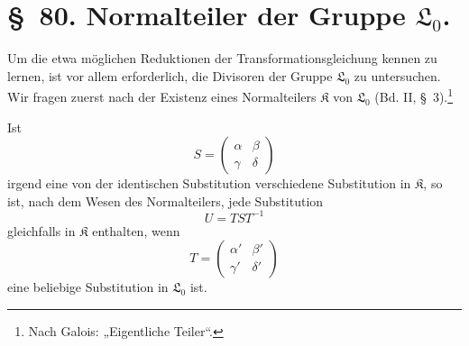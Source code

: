 \documentclass[11pt]{article}
\newcommand{\Lzero}{\mathfrak L_0}
\newcommand{\Kgrp}{\mathfrak K}
\begin{document}
\section*{\S~80. Normalteiler der Gruppe $\Lzero$.}

Um die etwa möglichen Reduktionen der Transformationsgleichung kennen zu lernen, ist vor allem erforderlich, die Divisoren der Gruppe $\Lzero$ zu untersuchen. Wir fragen zuerst nach der Existenz eines Normalteilers $\Kgrp$ von $\Lzero$ (Bd. II, \S~3).\footnote{Nach Galois: „Eigentliche Teiler“.}

Ist
\begin{equation}
 S=\begin{pmatrix}\alpha&\beta\\\gamma&\delta\end{pmatrix}
\tag{1}
\end{equation}
irgend eine von der identischen Substitution verschiedene Substitution in $\Kgrp$, so ist, nach dem Wesen des Normalteilers, jede Substitution
\begin{equation}
 U=TST^{-1}
\tag{2}
\end{equation}
gleichfalls in $\Kgrp$ enthalten, wenn
\begin{equation}
 T=\begin{pmatrix}\alpha'&\beta'\\\gamma'&\delta'\end{pmatrix}
\tag{3}
\end{equation}
eine beliebige Substitution in $\Lzero$ ist.
\end{document}

